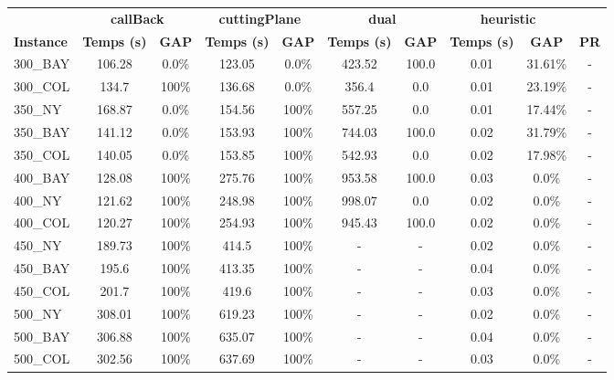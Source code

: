 \documentclass[main.tex]{subfiles}
\begin{document}
\begin{center}
\renewcommand{\arraystretch}{1.4} 
\begin{tabular}{lccccccccc}
	\hline
 & \multicolumn{2}{c}{\textbf{callBack}} & \multicolumn{2}{c}{\textbf{cuttingPlane}} & \multicolumn{2}{c}{\textbf{dual}} & \multicolumn{2}{c}{\textbf{heuristic}}\\
\textbf{Instance}  & \textbf{Temps (s)} & \textbf{GAP} & \textbf{Temps (s)} & \textbf{GAP} & \textbf{Temps (s)} & \textbf{GAP} & \textbf{Temps (s)} & \textbf{GAP} & \textbf{PR} \\\hline

300\_BAY & 106.28 & 0.0\% & 123.05 & 0.0\% & 423.52 & 100.0 & 0.01 & 31.61\% & - \\
300\_COL & 134.7 &  100\%  & 136.68 & 0.0\% & 356.4 & 0.0 & 0.01 & 23.19\% & - \\
350\_NY & 168.87 & 0.0\% & 154.56 &  100\%  & 557.25 & 0.0 & 0.01 & 17.44\% & - \\
350\_BAY & 141.12 & 0.0\% & 153.93 &  100\%  & 744.03 & 100.0 & 0.02 & 31.79\% & - \\
350\_COL & 140.05 & 0.0\% & 153.85 &  100\%  & 542.93 & 0.0 & 0.02 & 17.98\% & - \\
400\_BAY & 128.08 &  100\%  & 275.76 &  100\%  & 953.58 & 100.0 & 0.03 & 0.0\% & - \\
400\_NY & 121.62 &  100\%  & 248.98 &  100\%  & 998.07 & 0.0 & 0.02 & 0.0\% & - \\
400\_COL & 120.27 &  100\%  & 254.93 &  100\%  & 945.43 & 100.0 & 0.02 & 0.0\% & - \\
450\_NY & 189.73 &  100\%  & 414.5 &  100\%  & - & - 
 & 0.02 & 0.0\% & - \\
450\_BAY & 195.6 &  100\%  & 413.35 &  100\%  & - & - 
 & 0.04 & 0.0\% & - \\
450\_COL & 201.7 &  100\%  & 419.6 &  100\%  & - & - 
 & 0.03 & 0.0\% & - \\
500\_NY & 308.01 &  100\%  & 619.23 &  100\%  & - & - 
 & 0.02 & 0.0\% & - \\
500\_BAY & 306.88 &  100\%  & 635.07 &  100\%  & - & - 
 & 0.04 & 0.0\% & - \\
500\_COL & 302.56 &  100\%  & 637.69 &  100\%  & - & - 
 & 0.03 & 0.0\% & - \\
\hline\end{tabular}
\end{center}
\end{document}
